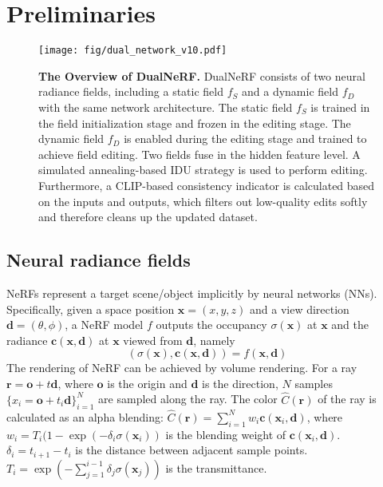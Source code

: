 \section{Preliminaries}

\begin{figure*}[t]
    \centering
    \texttt{[image: fig/dual\_network\_v10.pdf]}
    \caption{\textbf{The Overview of DualNeRF.} DualNeRF consists of two neural radiance fields, including a static field $f_S$ and a dynamic field $f_D$ with the same network architecture. The static field $f_S$ is trained in the field initialization stage and frozen in the editing stage. The dynamic field $f_D$ is enabled during the editing stage and trained to achieve field editing. Two fields fuse in the hidden feature level. A simulated annealing-based IDU strategy is used to perform editing. Furthermore, a CLIP-based consistency indicator is calculated based on the inputs and outputs, which filters out low-quality edits softly and therefore cleans up the updated dataset.}
    \label{fig: overview}
\end{figure*}

\subsection{Neural radiance fields}
\label{sec: Neural radiance fields}
NeRFs \cite{mildenhall2021nerf} represent a target scene/object implicitly by neural networks (NNs). Specifically, given a space position $\mathbf{x} = (x, y, z)$ and a view direction $\mathbf{d} = (\theta, \phi)$, a NeRF model $f$ outputs the occupancy $\sigma(\mathbf{x})$ at $\mathbf{x}$ and the radiance $\mathbf{c}(\mathbf{x}, \mathbf{d})$ at $\mathbf{x}$ viewed from $\mathbf{d}$, namely
\begin{equation}
    (\sigma(\mathbf{x}), \mathbf{c}(\mathbf{x}, \mathbf{d})) = f(\mathbf{x}, \mathbf{d})
    \label{equ: NeRF}
\end{equation}
The rendering of NeRF can be achieved by volume rendering. For a ray $\mathbf{r} = \mathbf{o} + t\mathbf{d}$, where $\mathbf{o}$ is the origin and $\mathbf{d}$ is the direction, $N$ samples $\{x_i = \mathbf{o} + t_i\mathbf{d}\}_{i=1}^{N}$ are sampled along the ray. The color $\hat{C}(\mathbf{r})$ of the ray is calculated as an alpha blending: $\hat{C}(\mathbf{r}) = \sum_{i=1}^{N}w_i\mathbf{c}(\mathbf{x}_i, \mathbf{d})$,
where $w_i = T_i(1-\exp(-\delta_i\sigma(\mathbf{x}_i))$
is the blending weight of $\mathbf{c}(\mathbf{x}_i, \mathbf{d})$. $\delta_i = t_{i+1} - t_i$ is the distance between adjacent sample points. $T_i = \exp(-\sum_{j=1}^{i-1}\delta_j\sigma(\mathbf{x}_j))$ is the transmittance.

